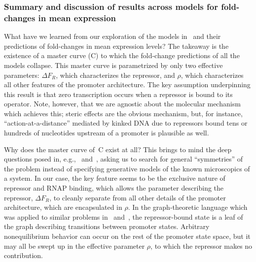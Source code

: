 \subsubsection{Summary and discussion of results across models for fold-changes in mean expression}
What have we learned from our exploration of the models
in~ and their predictions of fold-changes in mean
expression levels? The takeaway is the existence of a master curve
(C) to which the fold-change predictions of all the
models collapse. This master curve is parametrized by only two effective
parameters: $\Delta F_R$, which characterizes the repressor, and $\rho$, which
characterizes all other features of the promoter architecture. The key
assumption underpinning this result is that zero transcription occurs when a
repressor is bound to its operator. Note, however, that we are agnostic about
the molecular mechanism which achieves this; steric effects are the obvious
mechanism, but, for instance, ``action-at-a-distance'' mediated by kinked DNA
due to repressors bound tens or hundreds of nucleotides upstream of a promoter
is plausible as well.

Why does the master curve of~C exist at all? This
brings to mind the deep questions posed in, e.g.,~\cite{Frank2013}
and~\cite{Frank2014a}, asking us to search for general ``symmetries'' of the
problem instead of specifying generative models of the known microscopics of a
system. In our case, the key feature seems to be the exclusive nature of
repressor and RNAP binding, which allows the parameter describing the repressor,
$\Delta F_R$, to cleanly separate from all other details of the promoter
architecture, which are encapsulated in $\rho$. In the graph-theoretic language
which was applied to similar problems in~\cite{Gunawardena2012}
and~\cite{Ahsendorf2014}, the repressor-bound state is a leaf of the graph
describing transitions between promoter states. Arbitrary nonequilibrium
behavior can occur on the rest of the promoter state space, but it may all be
swept up in the effective parameter $\rho$, to which the repressor makes no
contribution.

